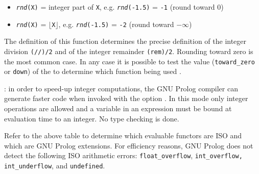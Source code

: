 \begin{itemize}

\item \texttt{\textit{rnd}(X)} = integer part of \texttt{X}, e.g.
\texttt{\textit{rnd}(-1.5)} = \texttt{-1} (round toward 0)

\item \texttt{\textit{rnd}(X)} = $\lfloor$\texttt{X}$\rfloor$, e.g.
\texttt{\textit{rnd}(-1.5)} = \texttt{-2} (round toward $-\infty$)

\end{itemize}

The definition of this function determines the precise definition of the
integer division \texttt{(//)/2} and of the integer remainder
\texttt{(rem)/2}. Rounding toward zero is the most common case. In any case
it is possible to test the value (\texttt{toward\_zero} or \texttt{down}) of
the   to determine which
function being used .

: in order to speed-up integer computations,
the GNU Prolog compiler can generate faster code when invoked with the
 option . In this mode only
integer operations are allowed and a variable in an expression must be bound
at evaluation time to an integer. No type checking is done. 

\begin{PlErrors}






\end{PlErrors}

\Portability

Refer to the above table to determine which evaluable functors are ISO
and which are GNU Prolog extensions. For efficiency reasons, GNU
Prolog does not detect the following ISO arithmetic errors:
\texttt{float\_overflow},
\texttt{int\_overflow, int\_underflow}, and \texttt{undefined}.

